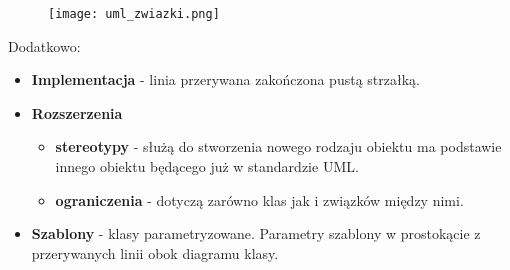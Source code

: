 \documentclass[../main.tex]{subfiles}
\begin{document}
    \begin{figure}[H]
        \texttt{[image: uml\_zwiazki.png]}
    \end{figure}

    Dodatkowo:
    \begin{itemize}
        \item \textbf{Implementacja} - linia przerywana
        zakończona pustą strzałką.
        \item \textbf{Rozszerzenia}
        \begin{itemize}
            \item \textbf{stereotypy} - służą do stworzenia nowego rodzaju obiektu ma podstawie innego obiektu
            będącego już w standardzie UML.
            \item \textbf{ograniczenia} - dotyczą zarówno klas jak i związków między nimi.
        \end{itemize}
        \item \textbf{Szablony} - klasy parametryzowane. Parametry szablony w prostokącie z przerywanych linii
        obok diagramu klasy.
    \end{itemize}

    
\end{document}
